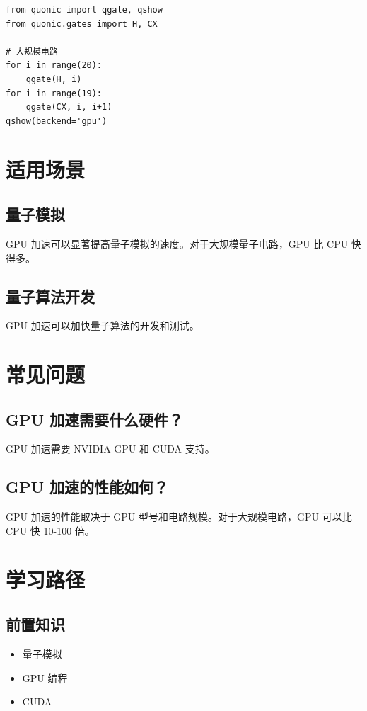 \documentclass[12pt,a4paper]{article}
\begin{document}
\begin{verbatim}
from quonic import qgate, qshow
from quonic.gates import H, CX

# 大规模电路
for i in range(20):
    qgate(H, i)
for i in range(19):
    qgate(CX, i, i+1)
qshow(backend='gpu')
\end{verbatim}

\section{适用场景}

\subsection{量子模拟}

GPU 加速可以显著提高量子模拟的速度。对于大规模量子电路，GPU 比 CPU 快得多。

\subsection{量子算法开发}

GPU 加速可以加快量子算法的开发和测试。

\section{常见问题}

\subsection{GPU 加速需要什么硬件？}

GPU 加速需要 NVIDIA GPU 和 CUDA 支持。

\subsection{GPU 加速的性能如何？}

GPU 加速的性能取决于 GPU 型号和电路规模。对于大规模电路，GPU 可以比 CPU 快 10-100 倍。

\section{学习路径}

\subsection{前置知识}
\begin{itemize}
  \item 量子模拟
  \item GPU 编程
  \item CUDA
\end{itemize}
\end{document}
